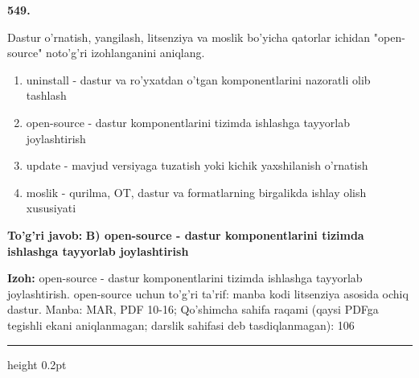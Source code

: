 \documentclass[10pt,a4paper]{article}
\begin{document}
{\bfseries\sffamily\color{ink} 549.}
\par
Dastur o'rnatish, yangilash, litsenziya va moslik bo'yicha qatorlar ichidan "open-source" noto'g'ri izohlanganini aniqlang.
\begin{enumerate}[label=\Alph*),leftmargin=9mm]
\item uninstall - dastur va ro'yxatdan o'tgan komponentlarini nazoratli olib tashlash
\item open-source - dastur komponentlarini tizimda ishlashga tayyorlab joylashtirish
\item update - mavjud versiyaga tuzatish yoki kichik yaxshilanish o'rnatish
\item moslik - qurilma, OT, dastur va formatlarning birgalikda ishlay olish xususiyati
\end{enumerate}
\begin{tcolorbox}[enhanced,breakable,colback=teal!4,colframe=teal!60!black,boxrule=0.45pt,arc=1.2mm,left=2.7mm,right=2.7mm,top=1.8mm,bottom=1.8mm,before skip=2mm,after skip=2mm]
{\bfseries\sffamily\color{teal}To'g'ri javob:} \textbf{B) open-source - dastur komponentlarini tizimda ishlashga tayyorlab joylashtirish}
\par\smallskip
{\bfseries Izoh:} open-source - dastur komponentlarini tizimda ishlashga tayyorlab joylashtirish. open-source uchun to'g'ri ta'rif: manba kodi litsenziya asosida ochiq dastur. Manba: MAR, PDF 10-16; Qo'shimcha sahifa raqami (qaysi PDFga tegishli ekani aniqlanmagan; darslik sahifasi deb tasdiqlanmagan): 106
\end{tcolorbox}
\vspace{2mm}\hrule height 0.2pt\vspace{3mm}
\end{document}
